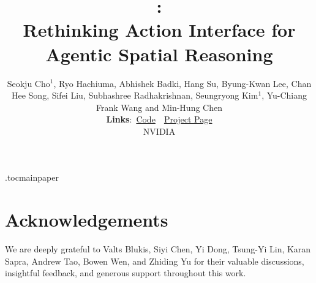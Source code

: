 \documentclass[10pt,logo,copyright]{nvidiatechreport}
\title{\ours{}:\\Rethinking Action Interface for Agentic Spatial Reasoning}
\author{Seokju Cho$^{1}$, Ryo Hachiuma, Abhishek Badki, Hang Su, Byung-Kwan Lee, Chan Hee Song, Sifei Liu,
Subhashree Radhakrishnan, Seungryong Kim$^{1}$, Yu-Chiang Frank Wang and Min-Hung Chen\\
{\Affilfont \textbf{Links}:~\href{https://github.com/NVlabs/SpatialClaw}{Code}~\textperiodcentered~\href{https://spatialclaw.github.io/}{Project Page}}\\
{\Affilfont NVIDIA}}
\begin{document}
\etocdepthtag.toc{mainpaper}

\maketitle
\vspace{-6.5mm}




\abscontent






\section*{Acknowledgements}
We are deeply grateful to Valts Blukis, Siyi Chen, Yi Dong, Tsung-Yi Lin, Karan Sapra, Andrew Tao, Bowen Wen, and Zhiding Yu for their valuable discussions, insightful feedback, and generous support throughout this work.

\clearpage


\clearpage
{}


\end{document}
